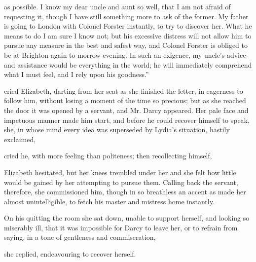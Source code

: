 as possible. I know my dear uncle and aunt so well, that I am not afraid of requesting it, though I have still something more to ask of the former. My father is going to London with Colonel Forster instantly, to try to discover her. What he means to do I am sure I know not; but his excessive distress will not allow him to pursue any measure in the best and safest way, and Colonel Forster is obliged to be at Brighton again to-morrow evening. In such an exigence, my uncle's advice and assistance would be everything in the world; he will immediately comprehend what I must feel, and I rely upon his goodness.”

 cried Elizabeth, darting from her seat as she finished the letter, in eagerness to follow him, without losing a moment of the time so precious; but as she reached the door it was opened by a servant, and Mr. Darcy appeared. Her pale face and impetuous manner made him start, and before he could recover himself to speak, she, in whose mind every idea was superseded by Lydia's situation, hastily exclaimed, 

 cried he, with more feeling than politeness; then recollecting himself, 

Elizabeth hesitated, but her knees trembled under her and she felt how little would be gained by her attempting to pursue them. Calling back the servant, therefore, she commissioned him, though in so breathless an accent as made her almost unintelligible, to fetch his master and mistress home instantly.

On his quitting the room she sat down, unable to support herself, and looking so miserably ill, that it was impossible for Darcy to leave her, or to refrain from saying, in a tone of gentleness and commiseration, 

 she replied, endeavouring to recover herself. 

